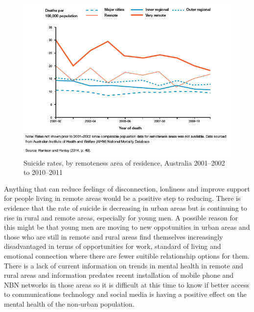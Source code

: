 \begin{figure}
\centering
\includegraphics[scale=0.8]{figures/SuicideRatesRemoteCommunities.png}
\caption{Suicide rates, by remoteness area of residence, Australia 2001--2002 to 2010--2011\cite[p27]{RefWorks:326}}
\end{figure}


Anything that can reduce feelings of disconnection, lonliness and improve support for people living in remote areas would be a positive step to reducing. There is evidence that the rate of suicide is decreasing in urban areas but is continuing to rise in rural and remote areas, especially for young men\cite{Conv2012}. A possible reason for this might be that young men are moving to new oppotunities in urban areas and those who are still in remote and rural areas find themselves increasingly disadvantaged in terms of opportunities for work, standard of living and emotional connection where there are fewer suitible relationship options for them\cite{PitmanAlexandra2012Siym}. There is a lack of current information on trends in mental health in remote and rural areas and information predates recent installation of mobile phone and NBN networks in those areas so it is difficult at this time to know if better access to communications technology and social media is having a positive effect on the mental health of the non-urban population. 
